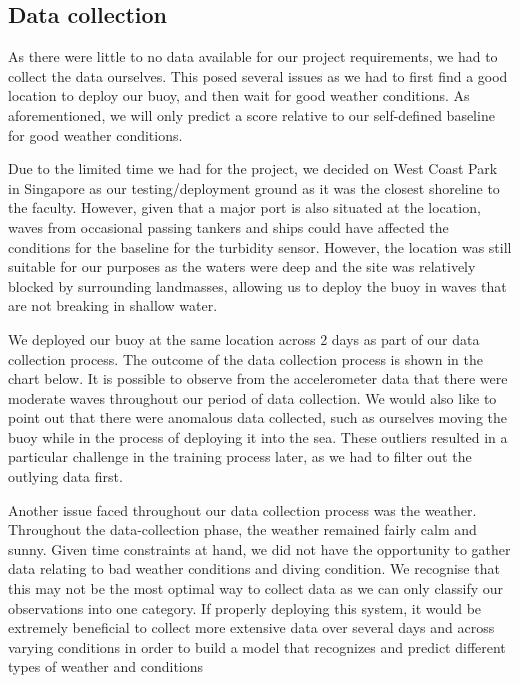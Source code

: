\documentclass{article}
\begin{document}
\subsection{Data collection}

\begin{multicols}{2}

As there were little to no data available for our project requirements, we had to collect the data ourselves. This posed several issues as we had to first find a good location to deploy our buoy, and then wait for good weather conditions. As aforementioned, we will only predict a score relative to our self-defined baseline for good weather conditions.

Due to the limited time we had for the project, we decided on West Coast Park in Singapore as our testing/deployment ground as it was the closest shoreline to the faculty. However, given that a major port is also situated at the location, waves from occasional passing tankers and ships could have affected the conditions for the baseline for the turbidity sensor. However, the location was still suitable for our purposes as the waters were deep and the site was relatively blocked by surrounding landmasses, allowing us to deploy the buoy in waves that are not breaking in shallow water. 

We deployed our buoy at the same location across 2 days as part of our data collection process. The outcome of the data collection process is shown in the chart below. It is possible to observe from the accelerometer data that there were moderate waves throughout our period of data collection. We would also like to point out that there were anomalous data collected, such as ourselves moving the buoy while in the process of deploying it into the sea. These outliers resulted in a particular challenge in the training process later, as we had to filter out the outlying data first.

Another issue faced throughout our data collection process was the weather. Throughout the data-collection phase, the weather remained fairly calm and sunny. 
Given time constraints at hand, we did not have the opportunity to gather data relating to bad weather conditions and diving condition. We recognise that this may not be the most optimal way to collect data as we can only classify our observations into one category. If properly deploying this system, it would be extremely beneficial to collect more extensive data over several days and across varying conditions in order to build a model that recognizes and predict different types of weather and conditions 



\end{multicols}
\end{document}
